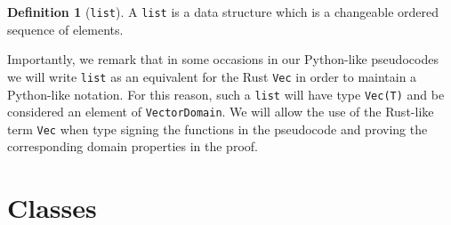 \documentclass[11pt,a4paper]{article}
\theoremstyle{definition}
\newtheorem{definition}[theorem]{Definition}
\begin{document}
\begin{definition}[\texttt{list}]
    A \texttt{list} is a data structure which is a changeable ordered sequence of elements.
\end{definition}

Importantly, we remark that in some occasions in our Python-like pseudocodes we will write \texttt{list} as an equivalent for the Rust \texttt{Vec} in order to maintain a Python-like notation. For this reason, such a \texttt{list} will have type \texttt{Vec(T)} and be considered an element of \texttt{VectorDomain}. We will allow the use of the Rust-like term \texttt{Vec} when type signing the functions in the pseudocode and proving the corresponding domain properties in the proof.

\section{Classes}
\end{document}
